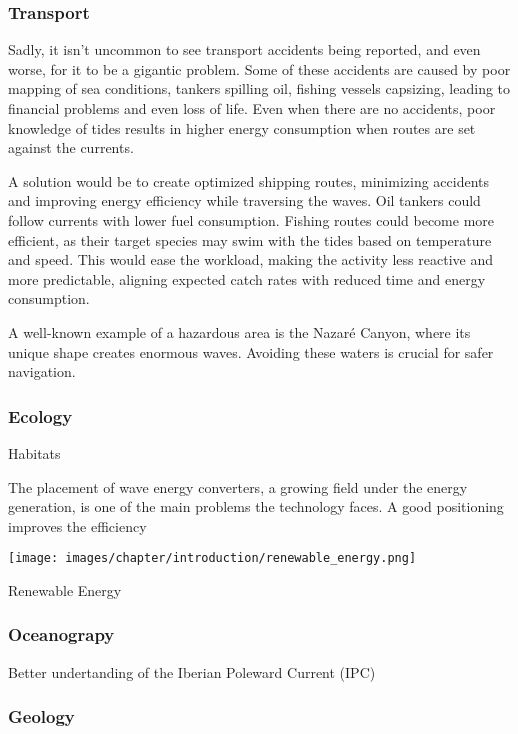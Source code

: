 \subsubsection{Transport}
Sadly, it isn't uncommon to see transport accidents being reported, and even worse, for it to be a gigantic problem.
Some of these accidents are caused by poor mapping of sea conditions, tankers spilling oil, fishing vessels capsizing, leading
to financial problems and even loss of life. Even when there are no accidents, poor knowledge of tides results in higher energy consumption when routes are set against the currents.

A solution would be to create optimized shipping routes, minimizing accidents and improving energy efficiency while 
traversing the waves. Oil tankers could follow currents with lower fuel consumption. Fishing routes could become more
efficient, as their target species may swim with the tides based on temperature and speed. This would ease the workload,
making the activity less reactive and more predictable, aligning expected catch rates with reduced time and energy 
consumption.

A well-known example of a hazardous area is the Nazaré Canyon, where its unique shape creates enormous waves. 
Avoiding these waters is crucial for safer navigation.

\subsubsection{Ecology}


Habitats 

The placement of wave energy converters, a growing field under the energy generation, is one of the main problems the
technology faces. A good positioning improves the efficiency
\begin{center}
    \texttt{[image: images/chapter/introduction/renewable\_energy.png]}  %
    
    \label{fig:The Design of a Wave Energy Converter to Electricity}        
\end{center}

Renewable Energy 

\subsubsection{Oceanograpy}
Better undertanding of the Iberian Poleward Current (IPC)

\subsubsection{Geology}

